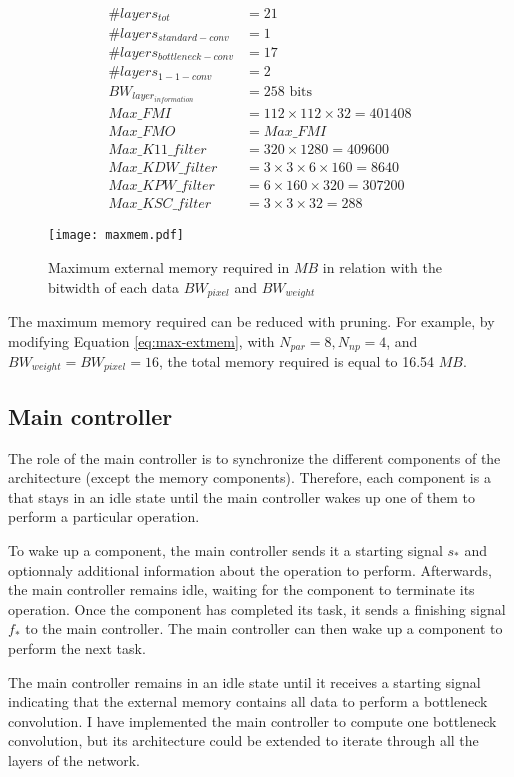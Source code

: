 \begin{align*}
    \# layers_{tot} &= 21 \\
    \# layers_{standard-conv} &= 1 \\
    \# layers_{bottleneck-conv} &= 17 \\
    \# layers_{1-1-conv} &= 2 \\
    BW_{layer_{information}} &= 258 \text{ bits} \\
    Max\_FMI &= 112 \times 112 \times 32 = 401408 \\
    Max\_FMO &= Max\_FMI \\
    Max\_K11\_filter &= 320 \times 1280 = 409600 \\
    Max\_KDW\_filter &= 3 \times 3 \times 6 \times 160 = 8640\\
    Max\_KPW\_filter &= 6 \times 160 \times 320 = 307200 \\
    Max\_KSC\_filter &= 3 \times 3 \times 32 = 288
\end{align*}
%
\begin{figure}[H]
    \centering
    \texttt{[image: maxmem.pdf]}
    \caption{Maximum external memory required in $MB$ in relation with the bitwidth of each data $BW_{pixel}$ and $BW_{weight}$}
    \label{fig:max-mem}
\end{figure}
%
The maximum memory required can be reduced with pruning. For example, by modifying Equation \eqref{eq:max-extmem}, with $N_{par} = 8, N_{np} = 4$, and $BW_{weight} = BW_{pixel} = 16$, the total memory required is equal to 16.54 $MB$.
%
\subsection{Main controller}
%
The role of the main controller is to synchronize the different components of the architecture (except the memory components).  Therefore, each component is a  that stays in an idle state until the main controller wakes up one of them to perform a particular operation.

To wake up a component, the main controller sends it a starting signal $s_{*}$ and optionnaly additional information about the operation to perform. Afterwards, the main controller remains idle, waiting for the component to terminate its operation. Once the component has completed its task, it sends a finishing signal $f_{*}$ to the main controller. The main controller can then wake up a component to perform the next task.

The main controller remains in an idle state until it receives a starting signal indicating that the external memory contains all data to perform a bottleneck convolution. I have implemented the main controller to compute one bottleneck convolution, but its architecture could be extended to iterate through all the layers of the network.

